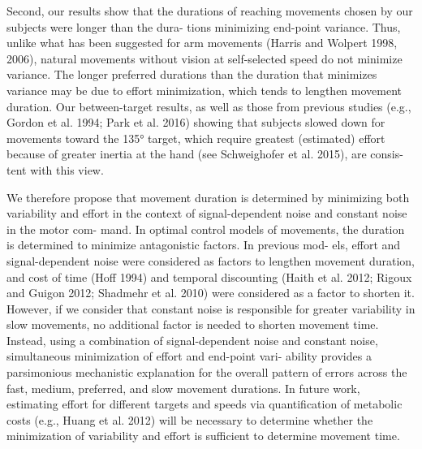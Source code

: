 Second, our results show that the durations of reaching movements chosen by our subjects were longer than the dura- tions minimizing end-point variance. Thus, unlike what has been suggested for arm movements (Harris and Wolpert 1998, 2006), natural movements without vision at self-selected speed do not minimize variance. The longer preferred durations than the duration that minimizes variance may be due to effort minimization, which tends to lengthen movement duration. Our between-target results, as well as those from previous studies (e.g., Gordon et al. 1994; Park et al. 2016) showing that subjects slowed down for movements toward the 135° target, which require greatest (estimated) effort because of greater inertia at the hand (see Schweighofer et al. 2015), are consis- tent with this view.

We therefore propose that movement duration is determined by minimizing both variability and effort in the context of signal-dependent noise and constant noise in the motor com- mand. In optimal control models of movements, the duration is determined to minimize antagonistic factors. In previous mod- els, effort and signal-dependent noise were considered as factors to lengthen movement duration, and cost of time (Hoff 1994) and temporal discounting (Haith et al. 2012; Rigoux and Guigon 2012; Shadmehr et al. 2010) were considered as a factor to shorten it. However, if we consider that constant noise is responsible for greater variability in slow movements, no additional factor is needed to shorten movement time. Instead, using a combination of signal-dependent noise and constant noise, simultaneous minimization of effort and end-point vari- ability provides a parsimonious mechanistic explanation for the overall pattern of errors across the fast, medium, preferred, and slow movement durations. In future work, estimating effort for different targets and speeds via quantification of metabolic costs (e.g., Huang et al. 2012) will be necessary to determine whether the minimization of variability and effort is sufficient to determine movement time.

